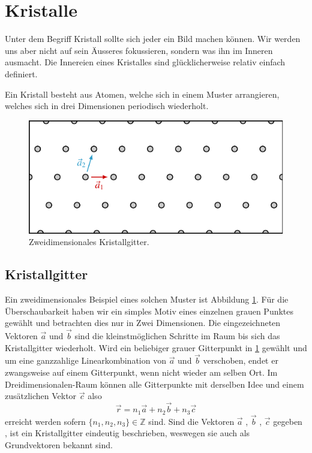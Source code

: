 \section{Kristalle}
Unter dem Begriff Kristall sollte sich jeder ein Bild machen können. 
Wir werden uns aber nicht auf sein Äusseres fokussieren, sondern was ihn im Inneren ausmacht.
Die Innereien eines Kristalles sind glücklicherweise relativ einfach definiert.
\begin{definition}[Kristall]
    Ein Kristall besteht aus Atomen, welche sich in einem Muster arrangieren, welches sich in drei Dimensionen periodisch wiederholt.
\end{definition}

\begin{figure}
    \centering
    \includegraphics[]{papers/punktgruppen/figures/lattice}
    \caption{
        Zweidimensionales Kristallgitter.
        \label{fig:punktgruppen:lattice}
    }
\end{figure}
\subsection{Kristallgitter}
Ein zweidimensionales Beispiel eines solchen Muster ist Abbildung \ref{fig:punktgruppen:lattice}.
Für die Überschaubarkeit haben wir ein simples Motiv eines einzelnen grauen Punktes gewählt und betrachten dies nur in Zwei Dimensionen.
Die eingezeichneten Vektoren $\vec{a}$ und $\vec{b}$ sind die kleinstmöglichen Schritte im Raum bis sich das Kristallgitter wiederholt.
Wird ein beliebiger grauer Gitterpunkt in \ref{fig:punktgruppen:lattice} gewählt 
und um eine ganzzahlige Linearkombination von $\vec{a}$ und $\vec{b}$ verschoben, 
endet er zwangsweise auf einem Gitterpunkt, wenn nicht wieder am selben Ort.
Im Dreidimensionalen-Raum können alle Gitterpunkte mit derselben Idee und einem zusätzlichen Vektor $\vec{c}$ also 
\[
    \vec{r} = n_1 \vec{a} + n_2 \vec{b} + n_3 \vec{c}   
\]
erreicht werden sofern $\{n_1,n_2,n_3\} \in \mathbb{Z}$ sind.
Sind die Vektoren  $\vec{a}$ , $\vec{b}$ , $\vec{c}$ gegeben ,
ist ein Kristallgitter eindeutig beschrieben, weswegen sie auch als Grundvektoren bekannt sind.

